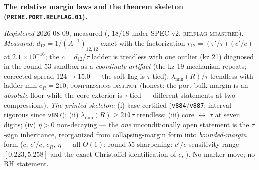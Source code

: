 \documentclass[11pt,a4paper]{article}
\begin{document}
\par\smallskip\noindent\textbf{The relative margin laws and
the theorem skeleton
(\texttt{PRIME.PORT.\allowbreak RELFLAG.01}).}
{\sloppy
\emph{Registered} 2026-08-09, measured
(, $18/18$ under SPEC v2,
\textsc{relflag-measured}).  \emph{Measured:} $d_{12} =
1/(A^{-1})_{12,12}$ exact with the factorization $r_{12} =
(\tau'/\tau)(c'/c)$ at $2.1\times10^{-16}$; the $c =
d_{12}/\tau$ ladder is trendless with one outlier (kz 21)
diagnosed in the round-53 sandbox as a \emph{coordinate
artifact} (the kz-19 mechanism repeats; corrected spread $124
\to 15.0$ --- the soft flag is $\tau$-tied);
$\lambda_{\min}(R)/\tau$ trendless with ladder min $c_R =
210$; \textsc{compressions-distinct} (honest: the port bulk
margin is an \emph{absolute} floor while the core exterior is
$\tau$-tied --- different statements at two compressions).
\emph{The printed skeleton:} (i) base certified
(\texttt{v884}/\texttt{v887}; interval-rigorous since
\texttt{v897}); (ii) $\lambda_{\min}(R) \ge
210\,\tau$ trendless; (iii) core $\leftrightarrow$ $\tau$ at
seven digits; (iv) $\eta > 0$ non-decaying --- the \emph{one}
unconditionally open statement is the $\tau$-sign inheritance,
reorganized from collapsing-margin form into
\emph{bounded-margin} form ($c$, $c'/c$, $c_R$, $\eta$ --- all
$O(1)$; round-55 sharpening: $c'/c$ sensitivity range
$[0.223, 5.258]$ and the exact Christoffel identification of
$c$, ).  No marker move;
no RH statement.\par}
\end{document}
